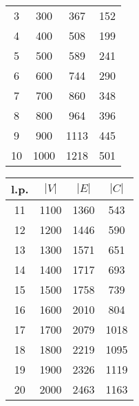 {\begin{table}
\begin{center}
\begin{tabular}{| c | c | c | c |}
      3 & 300 & 367 & 152 \\
      4 & 400 & 508 & 199 \\
      5 & 500 & 589 & 241 \\
      6 & 600 & 744 & 290 \\
      7 & 700 & 860 & 348 \\
      8 & 800 & 964 & 396 \\
      9 & 900 & 1113 &  445 \\
      10 & 1000 &  1218 &  501 \\ \hline
    \end{tabular} 
    \begin{tabular}{| c | c | c | c |}
      \hline
      l.p. & $|V|$ & $|E|$ & $|C|$ \\ \hline
      11 & 1100 & 1360 &  543 \\
      12 & 1200 & 1446 &  590 \\
      13 & 1300 & 1571 &  651 \\
      14 & 1400 & 1717 &  693 \\
      15 & 1500 & 1758 &  739 \\
      16 & 1600 & 2010 &  804 \\
      17 & 1700 & 2079 & 1018 \\
      18 & 1800 & 2219 & 1095 \\
      19 & 1900 & 2326 & 1119 \\
      20 & 2000 & 2463 & 1163 \\ \hline
    \end{tabular}
    \end{center}
    \label{tab_testdata}
  \end{table}
}
